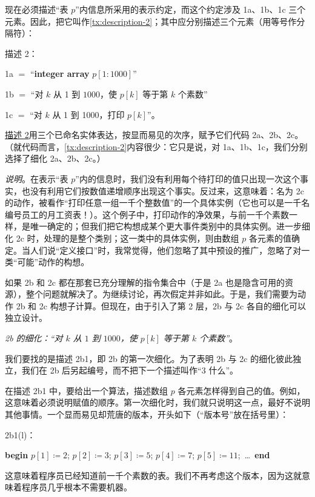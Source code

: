 \documentclass[twoside,11pt,fontset=none]{ctexbook}
\makeatletter
\newcommand{\labeltext}[2]{%
  \@bsphack
  \phantomsection
  \def\@currentlabel{#1}\label{#2}%
  \@esphack
}
\makeatother
\begin{document}
现在必须描述“表 $p$”内信息所采用的表示约定，而这个约定涉及 1a、1b、1c 三个元素。因此，把它叫作\ref{tx:description-2}；其中应分别描述三个元素（用等号作分隔符）：
\medskip

\noindent
描述 2：
\labeltext{描述 2}{tx:description-2}
\nopagebreak

\noindent
1a $=$ “\textbf{integer array} $p[1 : 1000]$”

\noindent
1b $=$ “对 $k$ 从 1 到 $1000$，使 $p[k]$ 等于第 $k$ 个素数”

\noindent
1c $=$ “对 $k$ 从 1 到 1000，打印 $p[k]$”。

\hyperref[tx:description-2]{描述 2}用三个已命名实体表达，按显而易见的次序，赋予它们代码 2a、2b、2c。（就代码而言，\ref{tx:description-2}内容很少：它只是说，对 1a、1b、1c，我们分别选择了细化 2a、2b、2c。）

\noindent
\textit{说明}。在表示“表 $p$”内的信息时，我们没有利用每个待打印的值只出现一次这个事实，也没有利用它们按数值递增顺序出现这个事实。反过来，这意味着：名为 2c 的动作，被看作“打印任意一组一千个整数值”的一个具体实例（它也可以是一千名编号员工的月工资表！）。这个例子中，打印动作的净效果，与前一千个素数一样，是唯一确定的；但我们把它构想成某个更大事件类别中的具体实例。进一步细化 2c 时，处理的是整个类别；这一类中的具体实例，则由数组 $p$ 各元素的值确定。当人们说“定义接口”时，我常觉得，他们忽略了其中预设的推广，忽略了对一类“可能”动作的构想。

如果 2b 和 2c 都在那套已充分理解的指令集合中（于是 2a 也是隐含可用的资源），整个问题就解决了。为继续讨论，再次假定并非如此。于是，我们需要为动作 2b 和 2c 构想子计算。但现在，由于引入了第 2 层，2b 与 2c 各自的细化可以独立设计。

\emph{2b 的细化：“对 $k$ 从 $1$ 到 $1000$，使 $p[k]$ 等于第 $k$ \emph{个}素数”}。

我们要找的是描述 2b1，即 2b 的第一次细化。为了表明 2b 与 2c 的细化彼此独立，我们在 2b 后另起编号，而不把下一个描述叫作“3 什么”。

在描述 2b1 中，要给出一个算法，描述数组 $p$ 各元素怎样得到自己的值。例如，这意味着必须说明赋值的顺序。第一次细化时，我们就只说明这一点，最好不说明其他事情。一个显而易见却荒唐的版本，开头如下（“版本号”放在括号里）：

\noindent
2b1(l)：
\nopagebreak

\noindent
\textbf{begin} $p[1] \coloneq 2$; $p[2] \coloneq 3$; $p[3] \coloneq 5$; $p[4] \coloneq 7$; $p[5] \coloneq 11$;\ \dots\ \textbf{end}

\noindent
这意味着程序员已经知道前一千个素数的表。我们不再考虑这个版本，因为这就意味着程序员几乎根本不需要机器。
\end{document}

